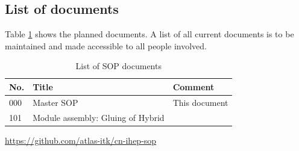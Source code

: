 \documentclass[12pt]{cnihepsop}
\begin{document}
\subsection{List of documents}
Table \ref{tbl:SOPlist} shows the planned documents. A list of all current documents is to be maintained and made accessible to all people involved.

\begin{table}[ht]
\begin{center}
\caption{List of SOP documents}
\label{tbl:SOPlist}

\bigskip

{\footnotesize
\begin{tabular}{lp{7cm}p{6cm}}
\toprule
No. & Title & Comment \\
\midrule
000 & Master SOP & This document \\

\midrule
101 & Module assembly: Gluing of Hybrid & \\

\bottomrule
\end{tabular}
}
\end{center}
\end{table}


\begin{thebibliography}{aaaaaaaa}
     \url{https://github.com/atlas-itk/cn-ihep-sop}

\end{thebibliography}
\end{document}
